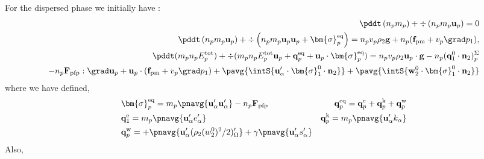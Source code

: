 For the dispersed phase we initially have :
\begin{align*}
    \pddt \left(n_p m_p\right)
    + \div \left(n_pm_p\textbf{u}_p
    \right)
    = 
    0\\
    \pddt \left(n_p m_p \textbf{u}_p\right)
    + \div \left(n_p
    m_p \textbf{u}_p \textbf{u}_p 
    + \bm{\sigma}_p^\text{eq}
    \right)
    = 
    n_p v_p \rho_2 \textbf{g}
    + n_p (\textbf{f}_\text{pm} + v_p \grad p_1),
    \\
    \pddt(m_p n_pE_p^\text{tot})
    + \div(m_pn_p E_p^\text{tot} \textbf{u}_p 
    + \textbf{q}_p^\text{eq} 
    + \textbf{u}_p \cdot \bm{\sigma}_p^\text{eq})
    =  n_p v_p \rho_2 \textbf{u}_p\cdot  \textbf{g}
    -  n_p (\textbf{q}_1^0 \cdot \textbf{n}_2)_p^\Sigma\\
    - n_p \textbf{F}_\text{pfp} : \grad \textbf{u}_p
    + \textbf{u}_p \cdot (\textbf{f}_\text{pm} + v_p\grad p_1)
    + \pavg{\intS{\textbf{u}_\alpha' \cdot\bm{\sigma}_1^0 \cdot \textbf{n}_2}}
    + \pavg{\intS{\textbf{w}_2^0 \cdot\bm{\sigma}_1^0 \cdot \textbf{n}_2}}
\end{align*}
where we have defined, 
\begin{align*}
    &\bm{\sigma}_p^\text{eq}
    =  m_p\pnavg{\textbf{u}_\alpha'\textbf{u}_\alpha'}
    - n_p \textbf{F}_\text{pfp}
    &\textbf{q}_p^\text{eq}
    =\textbf{q}_p^\text{e} 
    +\textbf{q}_p^\text{k}  
    +\textbf{q}_p^\text{w}  
    \\
    &\textbf{q}_1^\text{e}
    = m_p \pnavg{\textbf{u}_\alpha' e_\alpha'} 
    &\textbf{q}_p^\text{k}
    = m_p \pnavg{\textbf{u}_\alpha' k_\alpha} 
    \\
    &\textbf{q}_p^\text{w}
    = 
    + \pnavg{\textbf{u}_\alpha'(\rho_2 (w^0_2)^2/2 )'_\Omega}
    + \gamma \pnavg{\textbf{u}_\alpha' s_\alpha'}
\end{align*}
Also, 
